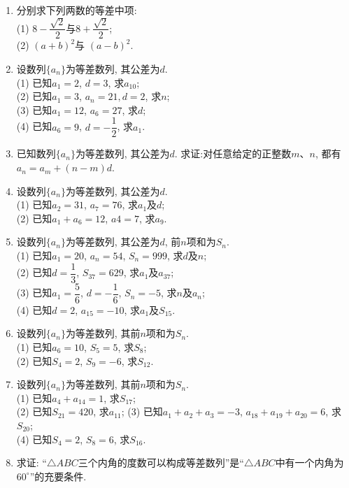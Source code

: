 \documentclass[10pt,a4paper]{article}
\begin{document}
\begin{enumerate}[1.]
\begin{center}
\end{center}
\item 分别求下列两数的等差中项:\\
(1) $8-\dfrac{\sqrt 2}2$与$8+\dfrac{\sqrt 2}2$;\\
(2) $(a+b)^2$与 $(a-b)^2$.
\item 设数列$\{a_n\}$为等差数列, 其公差为$d$.\\
(1) 已知$a_1=2$, $d=3$, 求$a_{10}$;\\
(2) 已知$a_1=3$, $a_n=21, d=2$, 求$n$;\\
(3) 已知$a_1=12$, $a_6=27$, 求$d$;\\
(4) 已知$a_6=9$, $d=-\dfrac 12$, 求$a_1$.
\item 已知数列$\{a_n\}$为等差数列, 其公差为$d$. 求证:对任意给定的正整数$m$、$n$, 都有$a_n=a_m+(n-m)d$.
\item 设数列$\{a_n\}$为等差数列, 其公差为$d$.\\
(1) 已知$a_2=31$, $a_7=76$, 求$a_1$及$d$;\\
(2) 已知$a_1+a_6=12$, $a4=7$, 求$a_9$.
\item 设数列$\{a_n\}$为等差数列, 其公差为$d$, 前$n$项和为$S_n$.\\
(1) 已知$a_1=20$, $a_n=54$, $S_n=999$, 求$d$及$n$;\\
(2) 已知$d=\dfrac 13$, $S_{37}=629$, 求$a_1$及$a_{37}$;\\
(3) 已知$a_1=\dfrac 56$, $d=-\dfrac 16$, $S_n=-5$, 求$n$及$a_n$;\\
(4) 已知$d=2$, $a_{15}=-10$, 求$a_1$及$S_15$.
\item 设数列$\{a_n\}$为等差数列, 其前$n$项和为$S_n$.\\
(1) 已知$a_6=10$, $S_5=5$, 求$S_8$;\\
(2) 已知$S_4=2$, $S_9=-6$, 求$S_{12}$.
\item 设数列$\{a_n\}$为等差数列, 其前$n$项和为$S_n$.\\
(1) 已知$a_4+a_{14}=1$, 求$S_{17}$;\\
(2) 已知$S_{21}=420$, 求$a_{11}$;
(3) 已知$a_1+a_2+a_3=-3$, $a_{18}+a_{19}+a_{20}=6$, 求$S_{20}$;\\
(4) 已知$S_4=2$, $S_8=6$, 求$S_{16}$.
\item 求证: ``$\triangle ABC$三个内角的度数可以构成等差数列''是``$\triangle ABC$中有一个内角为$60^\circ$''的充要条件.

\end{enumerate}
\end{document}
